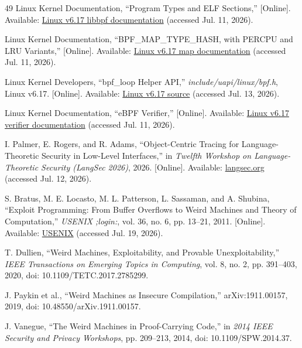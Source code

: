 \documentclass[conference]{IEEEtran}
\begin{document}
\begin{thebibliography}{49}
Linux Kernel Documentation, ``Program Types and ELF Sections,'' [Online]. Available: \href{https://www.kernel.org/doc/html/v6.17/bpf/libbpf/program_types.html}{Linux v6.17 libbpf documentation} (accessed Jul. 11, 2026).

Linux Kernel Documentation, ``BPF\_MAP\_TYPE\_HASH, with PERCPU and LRU Variants,'' [Online]. Available: \href{https://www.kernel.org/doc/html/v6.17/bpf/map_hash.html}{Linux v6.17 map documentation} (accessed Jul. 11, 2026).

Linux Kernel Developers, ``bpf\_loop Helper API,'' \emph{include/uapi/linux/bpf.h}, Linux v6.17. [Online]. Available: \href{https://git.kernel.org/pub/scm/linux/kernel/git/torvalds/linux.git/tree/include/uapi/linux/bpf.h?h=v6.17}{Linux v6.17 source} (accessed Jul. 13, 2026).

Linux Kernel Documentation, ``eBPF Verifier,'' [Online]. Available: \href{https://www.kernel.org/doc/html/v6.17/bpf/verifier.html}{Linux v6.17 verifier documentation} (accessed Jul. 11, 2026).

I. Palmer, E. Rogers, and R. Adams, ``Object-Centric Tracing for Language-Theoretic Security in Low-Level Interfaces,'' in \emph{Twelfth Workshop on Language-Theoretic Security (LangSec 2026)}, 2026. [Online]. Available: \href{https://langsec.org/spw26/papers/palmer-object-tracing.pdf}{langsec.org} (accessed Jul. 12, 2026).

S. Bratus, M. E. Locasto, M. L. Patterson, L. Sassaman, and A. Shubina, ``Exploit Programming: From Buffer Overflows to Weird Machines and Theory of Computation,'' \emph{USENIX ;login:}, vol. 36, no. 6, pp. 13--21, 2011. [Online]. Available: \href{https://www.usenix.org/publications/login/december-2011-volume-36-number-6/exploit-programming-buffer-overflows-weird}{USENIX} (accessed Jul. 19, 2026).

T. Dullien, ``Weird Machines, Exploitability, and Provable Unexploitability,'' \emph{IEEE Transactions on Emerging Topics in Computing}, vol. 8, no. 2, pp. 391--403, 2020, doi: 10.1109/TETC.2017.2785299.

J. Paykin et al., ``Weird Machines as Insecure Compilation,'' arXiv:1911.00157, 2019, doi: 10.48550/arXiv.1911.00157.

J. Vanegue, ``The Weird Machines in Proof-Carrying Code,'' in \emph{2014 IEEE Security and Privacy Workshops}, pp. 209--213, 2014, doi: 10.1109/SPW.2014.37.


\end{thebibliography}
\end{document}
